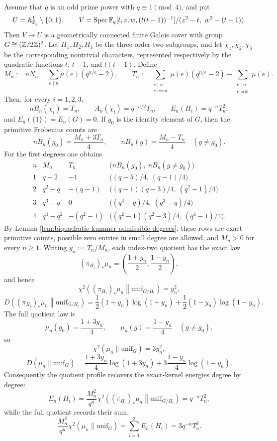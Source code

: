 \begin{proposition}\label{prop:checked-biquadratic-kummer-quotient-lattice}
Assume that \(q\) is an odd prime power with \(q\equiv1\pmod4\), and put
\[
U=\mathbb A^1_{\mathbb{F}_q}\setminus\{0,1\},
\qquad
V=\operatorname{Spec} \mathbb{F}_q[t,z,w,(t(t-1))^{-1}]/(z^2-t,\ w^2-(t-1)).
\]
Then \(V\to U\) is a geometrically connected finite \etale{} Galois cover with group
\(G\cong(\mathbb{Z}/2\mathbb{Z})^2\).  Let \(H_1,H_2,H_3\) be the three order-two
subgroups, and let \(\chi_1,\chi_2,\chi_3\) be the corresponding nontrivial
characters, represented respectively by the quadratic functions
\(t\), \(t-1\), and \(t(t-1)\).  Define
\[
M_n:=nN_n=\sum_{e\mid n}\mu(e)(q^{n/e}-2),
\qquad
T_n:=\sum_{\substack{e\mid n\\ e\text{ even}}}\mu(e)(q^{n/e}-2)
-\sum_{\substack{e\mid n\\ e\text{ odd}}}\mu(e).
\]
Then, for every \(i=1,2,3\),
\[
nB_n(\chi_i)=T_n,
\qquad
A_n(\chi_i)=q^{-n/2}T_n,
\qquad
E_n(H_i)=q^{-n}T_n^2,
\]
and \(E_n(\{1\})=E_n(G)=0\).  If \(g_0\) is the identity element of \(G\),
then the primitive Frobenius counts are
\[
nB_n(g_0)=\frac{M_n+3T_n}{4},
\qquad
nB_n(g)=\frac{M_n-T_n}{4}\quad(g\ne g_0).
\]
For the first degrees one obtains
\[
\begin{array}{c|c|c|c}
n&M_n&T_n&\bigl(nB_n(g_0),\ nB_n(g\ne g_0)\bigr)\\ \hline
1&q-2&-1&\bigl((q-5)/4,\ (q-1)/4\bigr)\\
2&q^2-q&-(q-1)&\bigl((q-1)(q-3)/4,\ (q^2-1)/4\bigr)\\
3&q^3-q&0&\bigl((q^3-q)/4,\ (q^3-q)/4\bigr)\\
4&q^4-q^2&-(q^2-1)&\bigl((q^2-1)(q^2-3)/4,\ (q^4-1)/4\bigr).
\end{array}
\]
By Lemma \ref{lem:biquadratic-kummer-admissible-degrees}, these rows are exact primitive counts, possible zero entries in small degree are allowed, and \(M_n>0\) for every \(n\ge1\).  Writing \(y_n:=T_n/M_n\), each index-two quotient has the exact law
\[
(\pi_{H_i})_\ast\mu_n=\left(\frac{1+y_n}{2},\frac{1-y_n}{2}\right),
\]
and hence
\[
\chi^2\!\left((\pi_{H_i})_\ast\mu_n\middle\|\mathrm{unif}_{G/H_i}\right)=y_n^2,
\]
\[
D\!\left((\pi_{H_i})_\ast\mu_n\middle\|\mathrm{unif}_{G/H_i}\right)
=\frac12(1+y_n)\log(1+y_n)+\frac12(1-y_n)\log(1-y_n).
\]
The full quotient law is
\[
\mu_n(g_0)=\frac{1+3y_n}{4},
\qquad
\mu_n(g)=\frac{1-y_n}{4}\quad(g\ne g_0),
\]
so
\[
\chi^2(\mu_n\|\mathrm{unif}_G)=3y_n^2,
\]
\[
D(\mu_n\|\mathrm{unif}_G)
=\frac{1+3y_n}{4}\log(1+3y_n)
+3\frac{1-y_n}{4}\log(1-y_n).
\]
Consequently the quotient profile recovers the exact-kernel energies degree by degree:
\[
E_n(H_i)=\frac{M_n^2}{q^n}
\chi^2\!\left((\pi_{H_i})_\ast\mu_n\middle\|\mathrm{unif}_{G/H_i}\right)
=q^{-n}T_n^2,
\]
while the full quotient records their sum,
\[
\frac{M_n^2}{q^n}\chi^2(\mu_n\|\mathrm{unif}_G)
=\sum_{i=1}^3E_n(H_i)=3q^{-n}T_n^2.
\]
\end{proposition}

